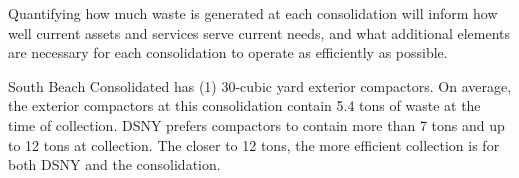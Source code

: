 
    Quantifying how much waste is generated at each consolidation will inform how well current assets and services serve current needs, and what additional elements are necessary for each consolidation to operate as efficiently as possible.
    
    South Beach Consolidated has (1) 30-cubic yard exterior compactors. On average, the exterior compactors at this consolidation contain 5.4 tons of waste at the time of collection. DSNY prefers compactors to contain more than 7 tons and up to 12 tons at collection. The closer to 12 tons, the more efficient collection is for both DSNY and the consolidation.